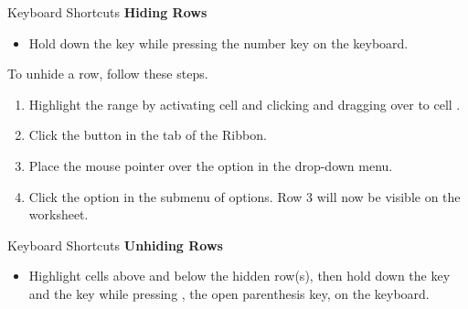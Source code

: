 \begin{center}
	\begin{shtcutbox}{Keyboard Shortcuts}
		\textbf{Hiding Rows}
		\\
		\begin{itemize}
			\setlength{\itemsep}{0pt}
			\setlength{\parskip}{0pt}
			\setlength{\parsep}{0pt}
			
			\item Hold down the  key while pressing the number  key on the keyboard.
			
		\end{itemize}
	\end{shtcutbox}
\end{center}

To unhide a row, follow these steps.

\begin{enumerate}
	\item Highlight the range  by activating cell  and clicking and dragging over to cell .
	\item Click the  button in the  tab of the Ribbon.
	\item Place the mouse pointer over the  option in the drop-down menu.
	\item Click the  option in the submenu of options. Row 3 will now be visible on the worksheet.
\end{enumerate}

\begin{center}
	\begin{shtcutbox}{Keyboard Shortcuts}
		\textbf{Unhiding Rows}
		\\
		\begin{itemize}
			\setlength{\itemsep}{0pt}
			\setlength{\parskip}{0pt}
			\setlength{\parsep}{0pt}
			
			\item Highlight cells above and below the hidden row(s), then hold down the  key and the  key while pressing \fmtKeystroke{(}, the open parenthesis key, on the keyboard.
			
		\end{itemize}
	\end{shtcutbox}
\end{center}

